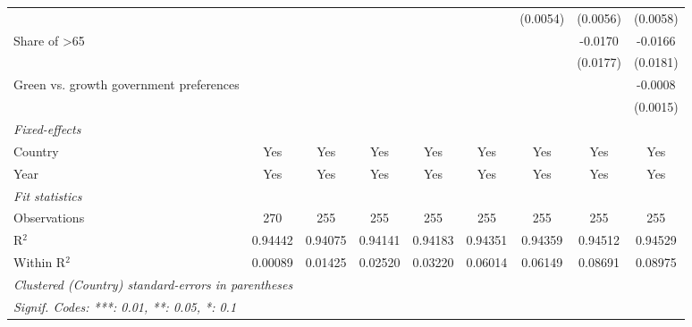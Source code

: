 \begin{table}[htbp]
\begin{tabular}{lcccccccc}
                                                       &          &          &          &          &          & (0.0054) & (0.0056) & (0.0058)\\   
      Share of >65                                     &          &          &          &          &          &          & -0.0170  & -0.0166\\   
                                                       &          &          &          &          &          &          & (0.0177) & (0.0181)\\   
      Green vs. growth government preferences          &          &          &          &          &          &          &          & -0.0008\\   
                                                       &          &          &          &          &          &          &          & (0.0015)\\   
      \midrule
      \emph{Fixed-effects}\\
      Country                                          & Yes      & Yes      & Yes      & Yes      & Yes      & Yes      & Yes      & Yes\\  
      Year                                             & Yes      & Yes      & Yes      & Yes      & Yes      & Yes      & Yes      & Yes\\  
      \midrule
      \emph{Fit statistics}\\
      Observations                                     & 270      & 255      & 255      & 255      & 255      & 255      & 255      & 255\\  
      R$^2$                                            & 0.94442  & 0.94075  & 0.94141  & 0.94183  & 0.94351  & 0.94359  & 0.94512  & 0.94529\\  
      Within R$^2$                                     & 0.00089  & 0.01425  & 0.02520  & 0.03220  & 0.06014  & 0.06149  & 0.08691  & 0.08975\\  
      \midrule \midrule
      \multicolumn{9}{l}{\emph{Clustered (Country) standard-errors in parentheses}}\\
      \multicolumn{9}{l}{\emph{Signif. Codes: ***: 0.01, **: 0.05, *: 0.1}}\\
   \end{tabular}
\end{table}


